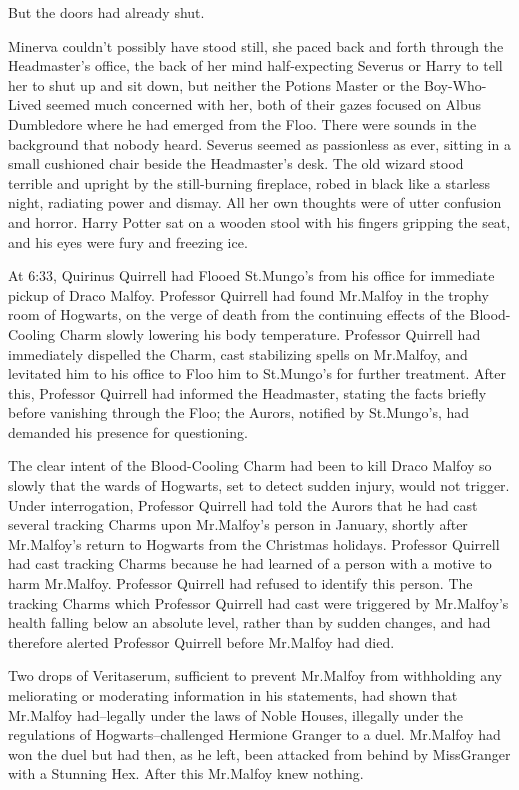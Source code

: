 But the doors had already shut.

\later

Minerva couldn't possibly have stood still, she paced back and forth through the Headmaster's office, the back of her mind half-expecting Severus or Harry to tell her to shut up and sit down, but neither the Potions Master or the Boy-Who-Lived seemed much concerned with her, both of their gazes focused on Albus Dumbledore where he had emerged from the Floo. There were sounds in the background that nobody heard. Severus seemed as passionless as ever, sitting in a small cushioned chair beside the Headmaster's desk. The old wizard stood terrible and upright by the still-burning fireplace, robed in black like a starless night, radiating power and dismay. All her own thoughts were of utter confusion and horror. Harry Potter sat on a wooden stool with his fingers gripping the seat, and his eyes were fury and freezing ice.

At 6:33\am, Quirinus Quirrell had Flooed St.\?Mungo's from his office for immediate pickup of Draco Malfoy. Professor Quirrell had found Mr.\?Malfoy in the trophy room of Hogwarts, on the verge of death from the continuing effects of the Blood-Cooling Charm slowly lowering his body temperature. Professor Quirrell had immediately dispelled the Charm, cast stabilizing spells on Mr.\?Malfoy, and levitated him to his office to Floo him to St.\?Mungo's for further treatment. After this, Professor Quirrell had informed the Headmaster, stating the facts briefly before vanishing through the Floo; the Aurors, notified by St.\?Mungo's, had demanded his presence for questioning.

The clear intent of the Blood-Cooling Charm had been to kill Draco Malfoy so slowly that the wards of Hogwarts, set to detect sudden injury, would not trigger. Under interrogation, Professor Quirrell had told the Aurors that he had cast several tracking Charms upon Mr.\?Malfoy's person in January, shortly after Mr.\?Malfoy's return to Hogwarts from the Christmas holidays. Professor Quirrell had cast tracking Charms because he had learned of a person with a motive to harm Mr.\?Malfoy. Professor Quirrell had refused to identify this person. The tracking Charms which Professor Quirrell had cast were triggered by Mr.\?Malfoy's health falling below an absolute level, rather than by sudden changes, and had therefore alerted Professor Quirrell before Mr.\?Malfoy had died.

Two drops of Veritaserum, sufficient to prevent Mr.\?Malfoy from withholding any meliorating or moderating information in his statements, had shown that Mr.\?Malfoy had\---legally under the laws of Noble Houses, illegally under the regulations of Hogwarts\---challenged Hermione Granger to a duel. Mr.\?Malfoy had won the duel but had then, as he left, been attacked from behind by Miss\?Granger with a Stunning Hex. After this Mr.\?Malfoy knew nothing.

